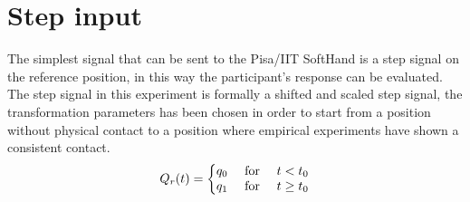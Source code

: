 \newpage
\section{Step input}
The simplest signal that can be sent to the Pisa/IIT SoftHand is a step signal on the reference position, in this way the participant's response can be evaluated. The step signal in this experiment is formally a shifted and scaled step signal, the transformation parameters has been chosen in order to start from a position without physical contact to a position where empirical experiments have shown a consistent contact. 
\begin{equation}
Q_{r}(t)=\left\{\begin{matrix}
q_{0} & $ for $ & t < t_0 \\ 
q_{1} & $ for $ & t \geq t_0
\end{matrix}\right.
\label{EQ:StepSignal}
\end{equation}
